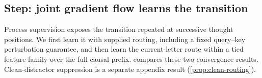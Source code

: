 \subsection{Step: joint gradient flow learns the transition}
\label{sec:step}
Process supervision exposes the transition repeated at successive thought
positions. We first learn it with supplied routing, including a fixed
query--key perturbation guarantee, and then learn the current-letter route
within a tied feature family over the full causal prefix.
 compares these two convergence results.
Clean-distractor suppression is a separate appendix result
(\cref{prop:clean-routing}).

\begin{table}[t]
\centering\small
{}
\caption{Two complementary convergence settings. Supplied routing includes fixed query--key robustness. Full-prefix routing uses a different planted tied feature and unequal fixed mobilities.}
\label{tab:step-settings}
\end{table}

